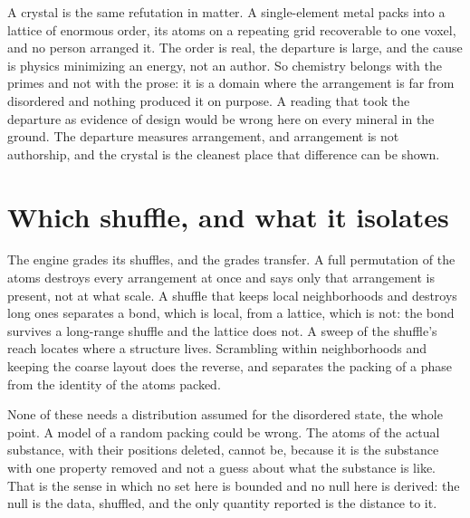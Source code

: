 A crystal is the same refutation in matter. A single-element metal packs into a lattice of enormous
order, its atoms on a repeating grid recoverable to one voxel, and no person arranged it. The order
is real, the departure is large, and the cause is physics minimizing an energy, not an author. So
chemistry belongs with the primes and not with the prose: it is a domain where the arrangement is far
from disordered and nothing produced it on purpose. A reading that took the departure as evidence of
design would be wrong here on every mineral in the ground. The departure measures arrangement, and
arrangement is not authorship, and the crystal is the cleanest place that difference can be shown.

\section{Which shuffle, and what it isolates}

The engine grades its shuffles, and the grades transfer. A full permutation of the atoms destroys
every arrangement at once and says only that arrangement is present, not at what scale. A shuffle
that keeps local neighborhoods and destroys long ones separates a bond, which is local, from a
lattice, which is not: the bond survives a long-range shuffle and the lattice does not. A sweep of
the shuffle's reach locates where a structure lives. Scrambling within neighborhoods and keeping the
coarse layout does the reverse, and separates the packing of a phase from the identity of the atoms
packed.

None of these needs a distribution assumed for the disordered state, the whole point. A
model of a random packing could be wrong. The atoms of the actual substance, with their positions
deleted, cannot be, because it is the substance with one property removed and not a guess
about what the substance is like. That is the sense in which no set here is bounded and no null
here is
derived: the null is the data, shuffled, and the only quantity reported is the distance to it.
